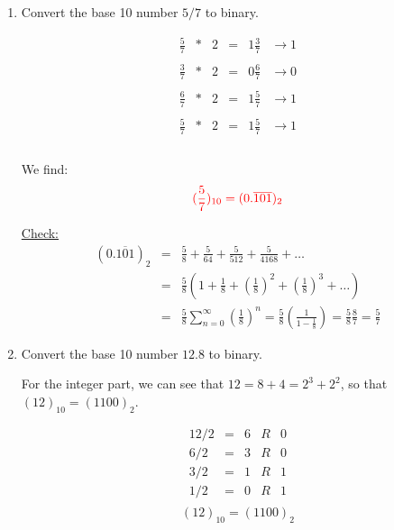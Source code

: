 \documentclass[pdftex,11pt]{article}
\begin{document}
\begin{enumerate}
\item
\color{red}Convert the base 10 number $5/7$ to binary.\color{black}

$$
\begin{array}{rcrccc}
\frac{5}{7}& *& 2   & = & 1\frac{3}{7}&    \rightarrow     1  \\\\
\frac{3}{7}& *& 2   & = & 0\frac{6}{7}&    \rightarrow     0  \\\\
\frac{6}{7}& *& 2   & = & 1\frac{5}{7}&    \rightarrow     1  \\\\
\hline
\frac{5}{7}& *& 2   & = & 1\frac{5}{7}&    \rightarrow     1  \\\\
\end{array}
$$

We find:
$$\color{red} (\frac{5}{7})_{10} = (0.\overline{101})_2 $$


\underline{Check:}
\begin{eqnarray}
(0.\overline{101})_{2} 
\nonumber & = & \frac{5}{8}+ \frac{5}{64}+ \frac{5}{512}+ \frac{5}{4168}+\ldots\\
\nonumber & = & \frac{5}{8}\left(1 + \frac{1}{8}+ \left(\frac{1}{8}\right)^2+ \left(\frac{1}{8}\right)^3+\ldots \right)\\
\nonumber & = & \frac{5}{8}\sum_{n=0}^\infty\left(\frac{1}{8}\right)^n
 = \frac{5}{8}\left(\frac{1}{1-\frac{1}{8}}\right)
 = \frac{5}{8}\frac{8}{7}
 = \frac{5}{7}
\end{eqnarray}












\item 
\color{red}Convert the base 10 number $12.8$ to binary.\color{black}

For the integer part, we can see that $12 = 8 + 4 = 2^3 + 2^2$, so that $(12)_{10}=(1100)_2$.
\begin{minipage}{.4\textwidth}
$$
\begin{array}{rcrcc}
12/2  & = &    6 & R & 0 \\
6/2   & = &    3 & R & 0 \\
3/2  & = &     1 & R & 1 \\
1/2  & = &     0 & R & 1 \\
\end{array}
$$
$$ (12)_{10} = (1100)_2$$
\end{minipage}



\end{enumerate}
\end{document}
